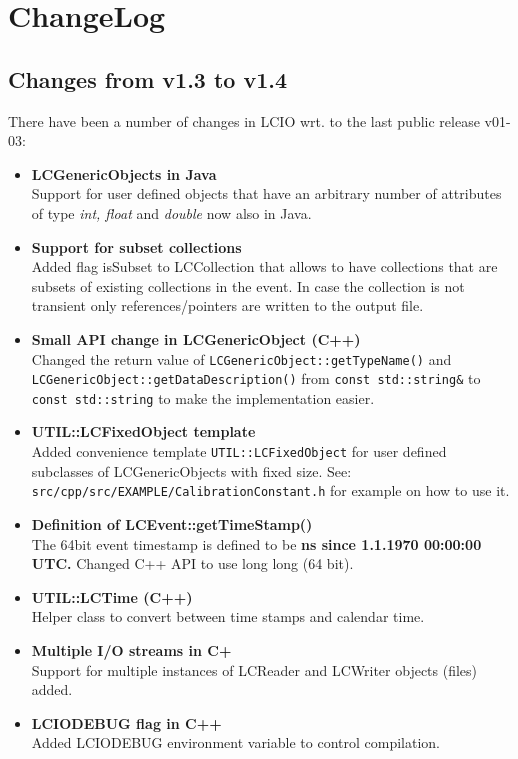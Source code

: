 \documentclass[twoside]{article}
\begin{document}
\newpage 
\begin{latexonly}
\end{latexonly}

\section{ChangeLog}
\subsection{Changes from v1.3 to v1.4}
There have been a number of changes in LCIO wrt. to the last public release v01-03:
\begin{itemize}
\item{{\bf LCGenericObjects in Java} \\
Support for user defined objects that have an arbitrary number of attributes of type {\em int, float}
and {\it double} now also in Java.
}
\item{{\bf Support for subset collections} \\
Added flag isSubset to LCCollection that allows to have collections that are subsets of existing collections
in the event. In case the collection is not transient only references/pointers are written to the output file.
}
\item{{\bf Small API change in LCGenericObject (C++)} \\
 Changed the return value of \verb$LCGenericObject::getTypeName()$ and 
 \verb$LCGenericObject::getDataDescription()$ from \verb$const std::string&$ to 
 \verb$const std::string$ to  make the implementation easier.
}
\item{{\bf UTIL::LCFixedObject template} \\
 Added convenience template \verb$UTIL::LCFixedObject$  for user defined subclasses of LCGenericObjects
 with fixed size.
 See: \verb$src/cpp/src/EXAMPLE/CalibrationConstant.h$ for example on how to use it.
}
\item{{\bf Definition of LCEvent::getTimeStamp()} \\
 The 64bit event timestamp is defined to be {\bf ns since 1.1.1970 00:00:00 UTC.}
 Changed C++ API to use long long (64 bit).
}
\item{{\bf UTIL::LCTime (C++)} \\
 Helper class to convert between time stamps and calendar time.
}
\item{{\bf Multiple I/O streams in C+} \\
 Support for multiple instances of LCReader and LCWriter objects (files) added.
}
\item{{\bf LCIODEBUG flag in C++} \\
 Added LCIODEBUG environment variable to control compilation.
}


\end{itemize}
\end{document}
